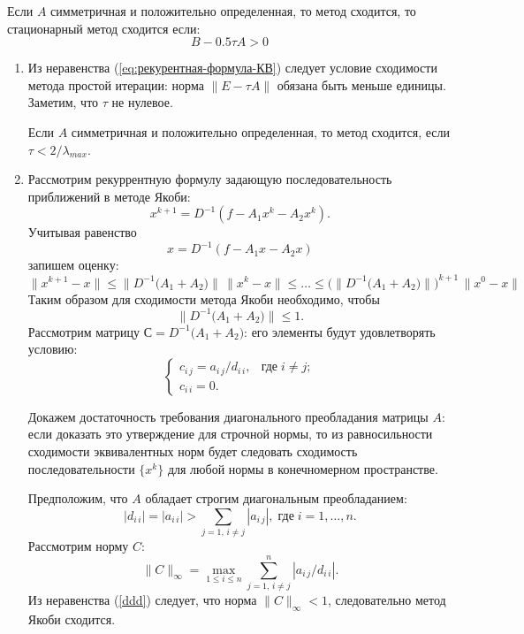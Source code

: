 \documentclass[12pt, a4paper]{article}
\newcommand{\norm}[1]{\lVert #1 \rVert}
\begin{document}
\begin{enumerate}
		Если $A$ симметричная и положительно определенная, то метод сходится, то стационарный метод сходится если:
		\[
		B - 0.5 \tau A > 0
		\]
		\begin{enumerate}
			\item Из неравенства (\ref{eq:рекурентная-формула-КВ}) следует условие сходимости метода простой итерации: норма $\norm{E - \tau A}$ обязана быть меньше единицы. Заметим, что $\tau$ не нулевое.
			
			Если $A$ симметричная и положительно определенная, то метод сходится, если $\tau < 2/\lambda_{max}$.
			
			
			\item Рассмотрим рекуррентную формулу задающую последовательность приближений в методе Якоби:
			\begin{equation}
				\label{eq:рекурентная-формула-якоби-КВ}
				x^{k+1} = D^{-1}(f - A_1 x^k - A_2 x^k ). 
			\end{equation}
			Учитывая равенство
			\[
			x = D^{-1}(f - A_1 x - A_2 x ) 
			\]
			запишем оценку:
			\[
			\norm{x^{k+1} - x} \le  \norm{D^{-1} \bigl(A_1 + A_2\bigr)} \, \norm{x^k - x} \le \ldots \le  \bigl(\norm{D^{-1}\bigl( A_1 + A_2\bigr)}\bigr)^{k+1} \, \norm{x^0 - x}
			\]
			Таким образом для сходимости метода Якоби необходимо, чтобы
			  \[
			  	\norm{D^{-1} \bigl(A_1 + A_2\bigr)} \le 1.
			  \]
			Рассмотрим матрицу $С = D^{-1} \bigl(A_1 + A_2\bigr)$: его элементы будут удовлетворять условию:
			\[
			\begin{cases}
			c_{i \, j} = a_{i \, j} / d_{i \, i}, & \text{где} \; i \neq j; \\
			c_{i \, i} = 0.
			\end{cases}
			\]
			
			Докажем достаточность требования диагонального преобладания матрицы $A$: если доказать это утверждение для строчной нормы, то из равносильности сходимости эквивалентных норм будет следовать сходимость последовательности $\{x^k\}$ для любой нормы в конечномерном пространстве.
			
			Предположим, что $A$ обладает строгим диагональным преобладанием:
			\begin{equation}
				\label{ddd}
				|d_{i \, i}| = |a_{i \, i}| > \sum_{j=1, \, i \neq j}|a_{i \, j}|, \; \text{где} \; i = 1,\ldots,n.
			\end{equation}
			Рассмотрим норму $C$:
			\[
			\norm{C}_\infty = \max_{1\le i\le n}\sum_{j=1, \, i \neq j}^{n} |a_{i \, j} / d_{i \, i}|.
			\]
			Из неравенства (\ref{ddd}) следует, что норма $\norm{C}_\infty < 1$, следовательно метод Якоби сходится.
			

\end{enumerate}
\end{enumerate}
\end{document}
